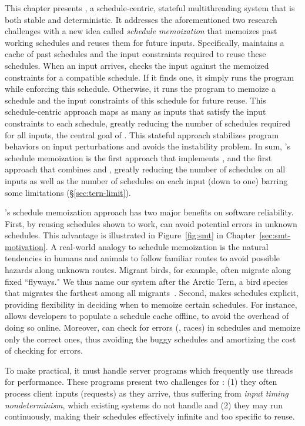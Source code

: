 This chapter presents \tern, a schedule-centric, stateful multithreading system 
that is both stable and deterministic. 
It addresses the aforementioned two research challenges with a new idea called
\emph{schedule memoization} that memoizes past working schedules and reuses them
for future inputs.  Specifically, \tern maintains a cache of past schedules and
the input constraints required to reuse these schedules.  When an input arrives,
\tern checks the input against the memoized constraints for a compatible
schedule.  If it finds one, it simply runs the program while enforcing
this schedule.  Otherwise, it runs the program to memoize a schedule and
the input constraints of this schedule for future reuse. This schedule-centric
approach maps as many as inputs that satisfy the input constraints to each
schedule, greatly reducing the number of schedules required for all inputs, the
central goal of \smt. This stateful approach stabilizes program behaviors
on input perturbations and avoids the instability problem. In sum, \tern's
schedule memoization is the first approach that implements \smt, and the first
approach that combines \smt and \dmt, greatly reducing the number of schedules
on all inputs as well as the number of schedules on each input (down to one)
barring some limitations (\S\ref{sec:tern-limit}).

\tern's schedule memoization approach has two major benefits on software
reliability. First, by reusing schedules shown to work, \tern can avoid
potential errors in unknown schedules.  This advantage is illustrated in
Figure~\ref{fig:smt} in Chapter~\ref{sec:smt-motivation}. A real-world analogy 
to schedule memoization is the natural tendencies in humans and animals to 
follow familiar routes to avoid possible hazards along unknown routes.  Migrant 
birds, for example, often migrate along fixed ``flyways."  We thus name our 
system after the Arctic Tern, a bird species that migrates the farthest among 
all migrants~\cite{artic-tern-wiki}. Second, \tern makes schedules explicit,
providing flexibility in deciding when to memoize certain schedules.  For
instance, \tern allows developers to populate a schedule cache offline, to avoid
the overhead of doing so online.  Moreover, \tern can check for errors (\eg,
races) in schedules and memoize only the correct ones, thus avoiding the buggy
schedules and amortizing the cost of checking for errors.

To make \tern practical, it must handle server programs which frequently
use threads for performance.  These programs present two challenges for
\tern: (1) they often process client inputs (requests) as they arrive, thus
suffering from \emph{input timing nondeterminism}, which existing \dmt systems
do not handle and (2) they may run continuously, making their schedules
effectively infinite and too specific to reuse.

